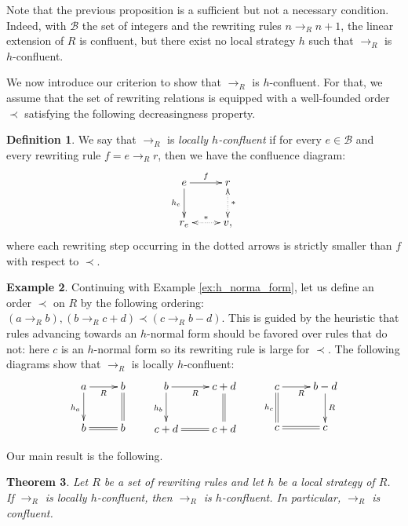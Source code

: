 \documentclass[10pt]{easychair}
\newtheorem{theorem}{Theorem}[section]
\theoremstyle{definition}
\newtheorem{definition}[theorem]{Definition}
\newtheorem{example}[theorem]{Example}
\newcommand\basis{\mathscr{B}}
\newcommand\rewR{\to_R}
\begin{document}
Note that the previous proposition is a sufficient but not a necessary
condition. Indeed, with $\basis$ the set of integers and the rewriting
rules $n\rewR n+1$, the linear extension of $R$ is confluent, but there
exist no local strategy $h$ such that $\rewR$ is $h$-confluent.
\medskip

We now introduce our criterion to show that $\rewR$ is $h$-confluent. For
that, we assume that the set of rewriting relations is equipped with a
well-founded order $\prec$ satisfying the following decreasingness
property.

\begin{definition}\label{proper:decreasingness_property}
  We say that $\rewR$ is \emph{locally $h$-confluent} if for every
  $e\in\basis$ and every rewriting rule $f=e\rewR r$, then we have the
  confluence diagram:
  \[
  \xymatrix @C = 2.5em @R = 2.5em{
    e 
    \ar [r] ^{f}
    \ar[d] _{h_e}
    &
    r
    \ar@{<.>} [d] ^{*}
    \\
    r_e
    \ar@{<.>} [r] ^{*}
    & 
    v,
  }
  \]
  where each rewriting step occurring in the dotted arrows is strictly
  smaller than $f$ with respect to  $\prec$.
\end{definition}
\smallskip

\begin{example}
  Continuing with Example \ref{ex:h_norma_form}, let us define an order
  $\prec$ on $R$ by the following ordering: $(a\rewR b), (b\rewR c+d)
  \prec (c\rewR b-d)$. This is guided by the heuristic that rules
  advancing towards an $h$-normal form should be favored over rules that
  do not: here $c$ is an $h$-normal form so its rewriting rule is large
  for $\prec$. The following diagrams show that $\rewR$ is locally
  $h$-confluent:
  \[
  \xymatrix @C = 2.5em @R = 2.5em{
    a \ar [r] _{R}  
    \ar [d] _{h_a}   
    & b 
    \ar@{=} [d]
    \\
    b
    \ar@{=} [r]
    & b
  }
  \qquad
  \xymatrix @C = 2.5em @R = 2.5em{
    b \ar [r] _{R}  
    \ar [d] _{h_b}   
    & c+d
    \ar@{=} [d]
    \\
    c+d
    \ar@{=} [r]
    & c+d
  }
  \qquad
  \xymatrix @C = 2.5em @R = 2.5em{
    c \ar [r] _{R}  
    \ar@{=} [d] _{h_c}   
    & b-d
    \ar [d] ^{R}
    \\
    c
    \ar@{=} [r]
    & c
  }
  \]
\end{example}
\medskip

Our main result is the following.
\smallskip

\begin{theorem}\label{thm:confluence_criterion}
  Let $R$ be a set of rewriting rules and let $h$ be a local strategy of
  $R$. If $\rewR$ is locally $h$-confluent, then $\rewR$ is
  $h$-confluent. In particular, $\rewR$ is confluent. 
\end{theorem}
\smallskip
\end{document}
